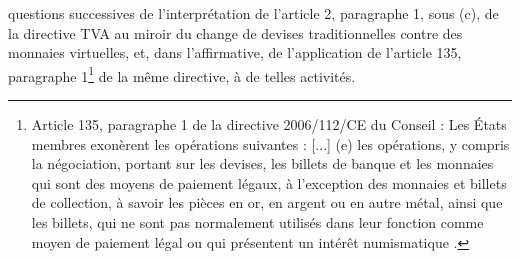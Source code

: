 {questions successives de l'interprétation de l'article 2, paragraphe 1, sous (c), de la directive TVA au miroir du change de devises traditionnelles contre des monnaies virtuelles, et, dans l'affirmative, de l'application de l'article 135, paragraphe 1\footnote{Article 135, paragraphe 1 de la directive 2006/112/CE du Conseil : \og Les États membres exonèrent les opérations suivantes : [...] (e) les opérations, y compris la négociation, portant sur les devises, les billets de banque et les monnaies qui sont des moyens de paiement légaux, à l'exception des monnaies et billets de collection, à savoir les pièces en or, en argent ou en autre métal, ainsi que les billets, qui ne sont pas normalement utilisés dans leur fonction comme moyen de paiement légal ou qui présentent un intérêt numismatique \fg{}.} de la même directive, à de telles activités.\par

}
